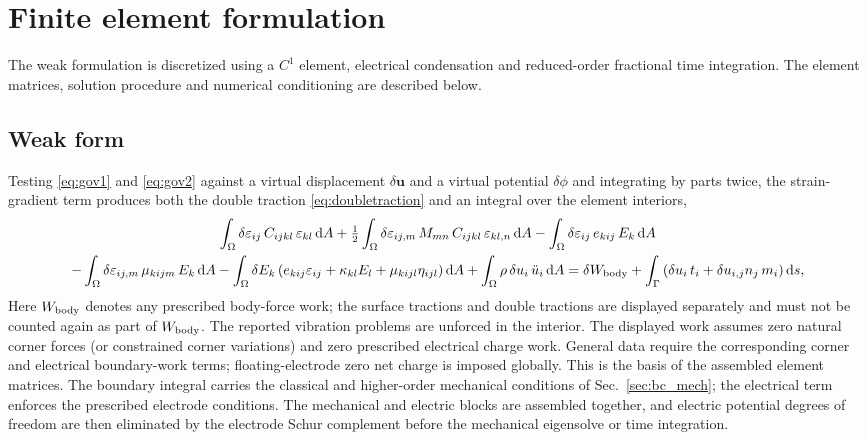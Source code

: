 \FloatBarrier
\section{Finite element formulation}
\label{sec:fem}

The weak formulation is discretized using a $C^1$ element, electrical
condensation and reduced-order fractional time integration. The element
matrices, solution procedure and numerical conditioning are described below.

\FloatBarrier
\subsection{Weak form}
\label{sec:weak}

Testing \eqref{eq:gov1} and \eqref{eq:gov2} against a virtual displacement
$\delta\bm{u}$ and a virtual potential $\delta\phi$ and integrating by parts
twice, the strain-gradient term produces both the double traction
\eqref{eq:doubletraction} and an integral over the element interiors,
\begin{multline}
  \int_\Omega \delta\varepsilon_{ij}\,C_{ijkl}\,\varepsilon_{kl}\,\mathrm{d}A
  + \tfrac12\int_\Omega \delta\varepsilon_{ij,m}\,M_{mn}\,C_{ijkl}\,
     \varepsilon_{kl,n}\,\mathrm{d}A
  - \int_\Omega \delta\varepsilon_{ij}\,e_{kij}\,E_k\,\mathrm{d}A \\
  - \int_\Omega \delta\varepsilon_{ij,m}\,\mu_{kijm}\,E_k\,\mathrm{d}A
  - \int_\Omega \delta E_k\left(e_{kij}\varepsilon_{ij}
     + \kappa_{kl}E_l + \mu_{kijl}\eta_{ijl}\right)\mathrm{d}A
  + \int_\Omega \rho\,\delta u_i\,\ddot u_i\,\mathrm{d}A
  = \delta W_{\rm body}
  + \int_{\Gamma}\left(\delta u_i\,t_i + \delta u_{i,j}n_j\,m_i\right)
    \mathrm{d}s ,
  \label{eq:weak}
\end{multline}
Here $W_{\rm body}$ denotes any prescribed body-force work; the surface
tractions and double tractions are displayed separately and must not be
counted again as part of $W_{\rm body}$. The reported vibration problems
are unforced in the interior. The displayed work assumes zero natural corner
forces (or constrained corner variations) and zero prescribed electrical
charge work. General data require the corresponding corner and electrical
boundary-work terms; floating-electrode zero net charge is imposed globally.
This is the basis of the assembled element
matrices. The boundary integral carries the classical and higher-order mechanical conditions of
Sec.~\ref{sec:bc_mech}; the electrical term enforces the prescribed electrode conditions. The
mechanical and electric blocks are assembled together, and electric
potential degrees of freedom are then eliminated by the electrode Schur
complement before the mechanical eigensolve or time integration.

